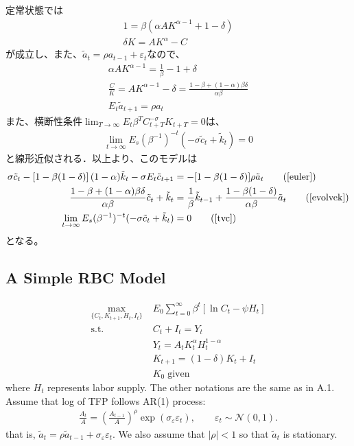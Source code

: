\documentclass[a4j, dvipdfmx]{jarticle}
\begin{document}
\begin{appendix}
定常状態では
\begin{align*}
1 = \beta (\alpha A K^{\alpha -1} + 1 - \delta)\\
\delta K = AK^\alpha - C
\end{align*}
が成立し、また、$\tilde a_t = \rho a_{t-1} + \varepsilon_t$なので、
\begin{align*}
\alpha A K^{\alpha -1} = \frac{1}{\beta} - 1 + \delta \\
\frac{C}{K} = AK^{\alpha -1} -\delta = \frac{1-\beta + (1-\alpha)\beta\delta}{\alpha\beta}\\
E_t\tilde a_{t+1} = \rho a_t
\end{align*}
また、横断性条件$\lim_{T\to\infty} E_t\beta^TC_{t+T}^{-\sigma}K_{t+T} = 0$は、
\begin{align*}
\lim_{t\to\infty} E_s (\beta^{-1})^{-t}(-\sigma \tilde c_t + \tilde k_t) = 0
\end{align*}
と線形近似される．以上より、このモデルは
\begin{align}
\sigma \tilde c_t - \left[1 - \beta(1 - \delta)\right] (1 - \alpha) \tilde k_t -\sigma E_t\tilde c_{t+1}&=  - [1 - \beta (1 - \delta)]\rho \tilde a_t\tag{\ref{euler}}\\
\frac{1-\beta + (1-\alpha)\beta\delta}{\alpha\beta} \tilde c_t + \tilde k_t &= \frac{1}{\beta} \tilde k_{t-1} + \frac{1-\beta(1-\delta)}{\alpha\beta} \tilde a_t\tag{\ref{evolvek}}\\
\lim_{t\to\infty} E_s (\beta^{-1})^{-t}(-\sigma \tilde c_t + \tilde k_t) &= 0 \tag{\ref{tvc}}
\end{align}
となる。


\subsection{A Simple RBC Model}
\begin{align*}
\max_{\{C_t, K_{t+1}, H_t, I_t\}} & \; E_0 \sum_{t=0}^\infty \beta^t [\ln C_t - \psi H_t]\\
\text{s.t.} & \; C_t + I_t = Y_t\\
& \; Y_t = A_t K_t^\alpha H_t^{1-\alpha}\\
& \; K_{t+1} = (1-\delta) K_t + I_t\\
& \; K_0 \; \text{given}
\end{align*}
where $H_t$ represents labor supply. The other notations are the same as in A.1. Assume that log of TFP follows AR(1) process:
\begin{align*}
\frac{A_t}{A} = \left(\frac{A_{t-1}}{A}\right)^\rho \exp (\sigma_\varepsilon \varepsilon_t), \qquad \varepsilon_t \sim \mathcal{N}(0,1).
\end{align*}
that is, $\tilde a_t = \rho \tilde a_{t-1} + \sigma_\varepsilon \varepsilon_t$. We also assume that $|\rho|<1$ so that $\tilde a_t$ is stationary.


\end{appendix}
\end{document}
